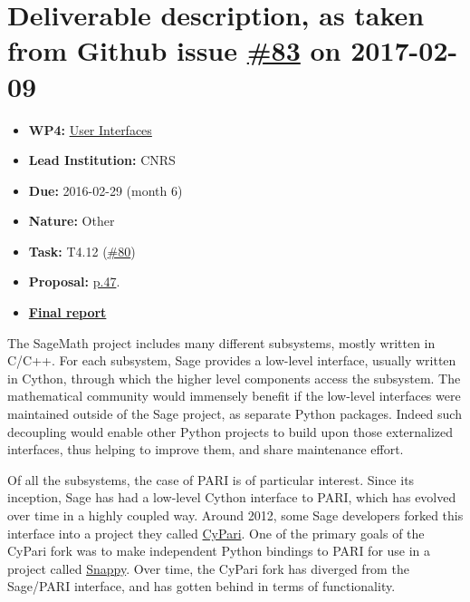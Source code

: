 \section*{\texorpdfstring{Deliverable description, as taken from Github
issue
\href{https://github.com/OpenDreamKit/OpenDreamKit/issues/83}{\#83} on
2017-02-09}{Deliverable description, as taken from Github issue \#83 on 2017-02-09}}\label{deliverable-description-as-taken-from-github-issue-83-on-2017-02-09}

\begin{itemize}
\tightlist
\item
  \textbf{WP4:}
  \href{https://github.com/OpenDreamKit/OpenDreamKit/tree/master/WP4}{User
  Interfaces}
\item
  \textbf{Lead Institution:} CNRS
\item
  \textbf{Due:} 2016-02-29 (month 6)
\item
  \textbf{Nature:} Other
\item
  \textbf{Task:} T4.12
  (\href{https://github.com/OpenDreamKit/OpenDreamKit/issues/80}{\#80})
\item
  \textbf{Proposal:}
  \href{https://github.com/OpenDreamKit/OpenDreamKit/raw/master/Proposal/proposal-www.pdf}{p.47}.
\item
  \textbf{\href{https://github.com/OpenDreamKit/OpenDreamKit/raw/master/WP4/D4.1/report-final.pdf}{Final
  report}}
\end{itemize}

The SageMath project includes many different subsystems, mostly written
in C/C++. For each subsystem, Sage provides a low-level interface,
usually written in Cython, through which the higher level components
access the subsystem. The mathematical community would immensely benefit
if the low-level interfaces were maintained outside of the Sage project,
as separate Python packages. Indeed such decoupling would enable other
Python projects to build upon those externalized interfaces, thus
helping to improve them, and share maintenance effort.

Of all the subsystems, the case of PARI is of particular interest. Since
its inception, Sage has had a low-level Cython interface to PARI, which
has evolved over time in a highly coupled way. Around 2012, some Sage
developers forked this interface into a project they called
\href{https://bitbucket.org/t3m/cypari/}{CyPari}. One of the primary
goals of the CyPari fork was to make independent Python bindings to PARI
for use in a project called
\href{https://bitbucket.org/t3m/snappy}{Snappy}. Over time, the CyPari
fork has diverged from the Sage/PARI interface, and has gotten behind in
terms of functionality.

